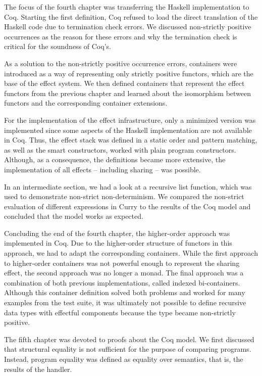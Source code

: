 \documentclass[a4paper, 11pt, fleqn, twoside, abstract=on]{scrreprt}
\begin{document}
The focus of the fourth chapter was transferring the Haskell implementation to Coq.
Starting the first definition, Coq refused to load the direct translation of the Haskell code due to termination check errors.
We discussed non-strictly positive occurrences as the reason for these errors and why the termination check is critical for the soundness of Coq's.

As a solution to the non-strictly positive occurrence errors, containers were introduced as a way of representing only strictly positive functors, which are the base of the effect system.
We then defined containers that represent the effect functors from the previous chapter and learned about the isomorphism between functors and the corresponding container extensions.

For the implementation of the effect infrastructure, only a minimized version was implemented since some aspects of the Haskell implementation are not available in Coq.
Thus, the effect stack was defined in a static order and pattern matching, as well as the smart constructors, worked with plain program constructors.
Although, as a consequence, the definitions became more extensive, the implementation of all effects -- including sharing -- was possible.

In an intermediate section, we had a look at a recursive list function, which was used to demonstrate non-strict non-determinism.
We compared the non-strict evaluation of different expressions in Curry to the results of the Coq model and concluded that the model works as expected.

Concluding the end of the fourth chapter, the higher-order approach was implemented in Coq.
Due to the higher-order structure of functors in this approach, we had to adapt the corresponding containers.
While the first approach to higher-order containers was not powerful enough to represent the sharing effect, the second approach was no longer a monad.
The final approach was a combination of both previous implementations, called indexed bi-containers.
Although this container definition solved both problems and worked for many examples from the test suite, it was ultimately not possible to define recursive data types with effectful components because the type became non-strictly positive.

The fifth chapter was devoted to proofs about the Coq model.
We first discussed that structural equality is not sufficient for the purpose of comparing programs.
Instead, program equality was defined as equality over semantics, that is, the results of the handler.
\end{document}
